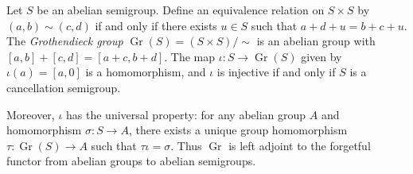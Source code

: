 Let $S$ be an abelian semigroup. Define an equivalence relation on $S \times S$ by $(a,b) \sim (c,d)$ if and only if there exists $u \in S$ such that $a + d + u = b + c + u$. The \textit{Grothendieck group} $\operatorname{Gr}(S) = (S \times S)/{\sim}$ is an abelian group with $[a,b] + [c,d] = [a+c, b+d]$. The map $\iota : S \to \operatorname{Gr}(S)$ given by $\iota(a) = [a,0]$ is a homomorphism, and $\iota$ is injective if and only if $S$ is a cancellation semigroup.

Moreover, $\iota$ has the universal property: for any abelian group $A$ and homomorphism $\sigma : S \to A$, there exists a unique group homomorphism $\tau : \operatorname{Gr}(S) \to A$ such that $\tau \iota = \sigma$. Thus $\operatorname{Gr}$ is left adjoint to the forgetful functor from abelian groups to abelian semigroups.
